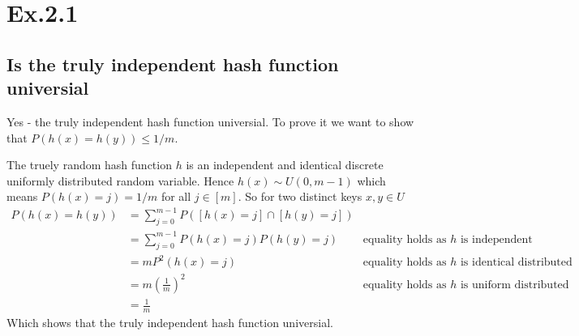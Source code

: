 \section*{Ex.2.1}
\subsection*{Is the truly independent hash function universial}

Yes - the truly independent hash function universial. 
To prove it we want to show that $P(h(x) = h(y))\leq 1/m$. 

The truely random hash function $h$ is an independent and identical discrete uniformly distributed random variable. 
Hence $h(x)\sim U(0,m-1)$ which means $P(h(x) = j) = 1/m$ for all $j\in[m]$. So for two distinct keys $x,y \in U$
\begin{align*}
P(h(x) = h(y)) &= \sum_{j=0}^{m-1} P([h(x)=j] \cap [h(y)=j])&\\
               &= \sum_{j=0}^{m-1}   P(h(x)=j) P(h(y)=j)    &\text{equality holds as $h$ is independent}\\
							 &= m P^2(h(x)=j)                             &\text{equality holds as $h$ is identical distributed}\\
							 &= m \left(\frac{1}{m}\right)^2              &\text{equality holds as $h$ is uniform distributed}\\
							 &= \frac{1}{m}                               &
\end{align*}
Which shows that the truly independent hash function universial.